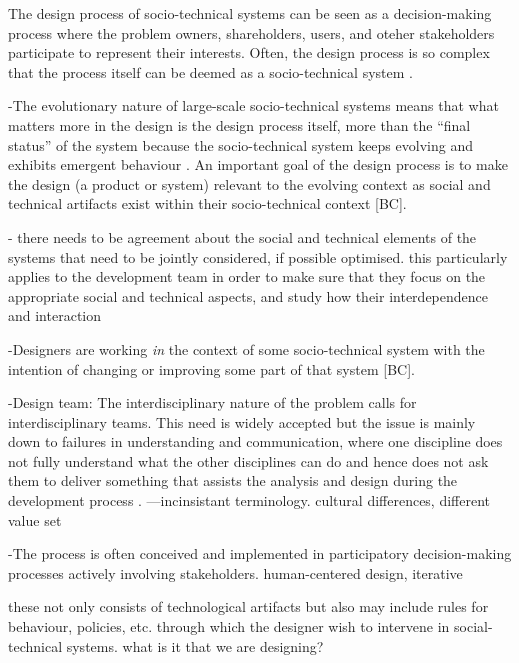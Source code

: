 \begin{svgraybox}




 The design process of socio-technical systems can be seen as a decision-making process where the problem owners, shareholders, users, and oteher stakeholders participate to represent their interests. Often, the design process is so complex that the process itself can be deemed as a socio-technical system \cite{Baxter2011}. 


-The evolutionary nature of large-scale socio-technical systems means that what matters more in the design is the design process itself, more than the ``final status'' of the system \cite{Shin2014, need more ref} because the socio-technical system keeps evolving and exhibits emergent behaviour \cite{Nikolic2009}. An important  goal of the design process is to make the design (a product or system) relevant to the evolving context \cite{Shin2014, need more ref} as social and technical artifacts exist within their socio-technical context [BC]. 

- there needs to be agreement about the social and technical elements of the systems that need to be jointly considered, if possible optimised. this particularly applies to the development team in order to make sure that they focus on the appropriate social and technical aspects, and study how their interdependence and interaction 

-Designers are working \textit{in} the context of some socio-technical system with the intention of changing or improving some part of that system [BC]. 

-Design team: The interdisciplinary nature of the problem calls for interdisciplinary teams. This need is widely accepted but the issue is mainly down to failures in understanding and communication, where one discipline does not fully understand what the other disciplines can do and hence does not ask them to deliver something that assists the analysis and design during the development process \cite{Baxter2011}. ---incinsistant terminology. cultural differences, different value set

-The process is often conceived and implemented in participatory decision-making processes actively involving stakeholders. human-centered design, iterative


 these not only consists of technological artifacts but also may include rules for behaviour, policies, etc. through which the designer wish to intervene in social-technical systems. what is it that we are designing? 


\end{svgraybox}
